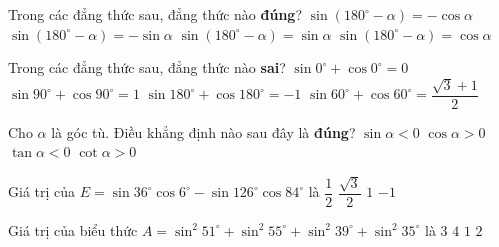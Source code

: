 \begin{ex}%
	Trong các đẳng thức sau, đẳng thức nào \textbf{đúng}?
	\choice
	{$\sin\left( 180^\circ-\alpha\right)=-\cos\alpha$}
	{$\sin\left(180^\circ-\alpha\right)=-\sin\alpha$}
	{\True $\sin\left(180^\circ-\alpha\right)=\sin\alpha$}
	{$\sin\left(180^\circ-\alpha\right)=\cos\alpha$}
\end{ex}
\begin{ex}%
	Trong các đẳng thức sau, đẳng thức nào \textbf{sai}?
	\choice
	{\True $\sin 0^\circ+\cos 0^\circ=0$}
	{$\sin 90^\circ+\cos 90^\circ=1$}
	{$\sin 180^\circ+\cos 180^\circ=-1$}
	{$\sin 60^\circ+\cos 60^\circ=\dfrac{\sqrt{3}+1}{2}$}
\end{ex}
\begin{ex}%
	Cho $\alpha$ là góc tù. Điều khẳng định nào sau đây là \textbf{đúng}?
	\choice
	{$\sin\alpha<0$}
	{$\cos\alpha>0$}
	{\True $\tan\alpha<0$}
	{$\cot\alpha>0$}
\end{ex}
\begin{ex}%
	Giá trị của $E=\sin 36^\circ\cos 6^\circ-\sin 126^\circ\cos 84^\circ$ là
	\choice
	{\True $\dfrac{1}{2}$}
	{$\dfrac{\sqrt{3}}{2}$}
	{$1$}
	{$-1$}
\end{ex}
\begin{ex}%
	Giá trị của biểu thức $A=\sin^2 51^\circ+\sin^2 55^\circ+\sin^2 39^\circ+\sin^2 35^\circ$ là
	\choice
	{$3$}
	{$4$}
	{$1$}
	{\True $2$}
\end{ex}
